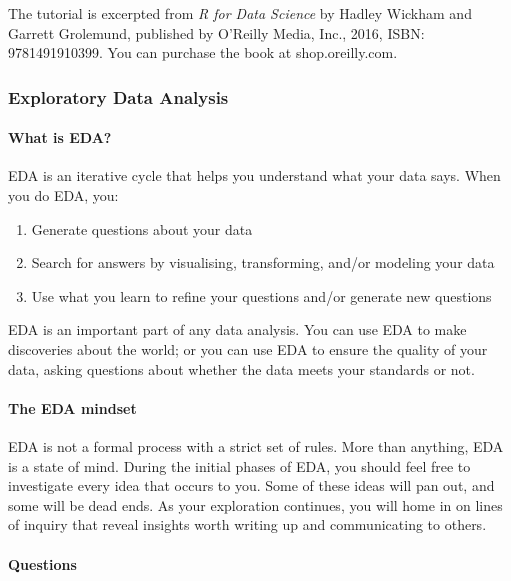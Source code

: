 \documentclass[
]{article}
\begin{document}
The tutorial is excerpted from \emph{R for Data Science} by Hadley
Wickham and Garrett Grolemund, published by O'Reilly Media, Inc., 2016,
ISBN: 9781491910399. You can purchase the book at shop.oreilly.com.

\hypertarget{exploratory-data-analysis-1}{%
\subsubsection{Exploratory Data
Analysis}\label{exploratory-data-analysis-1}}

\hypertarget{what-is-eda}{%
\paragraph{What is EDA?}\label{what-is-eda}}

EDA is an iterative cycle that helps you understand what your data says.
When you do EDA, you:

\begin{enumerate}
\def\labelenumi{\arabic{enumi}.}
\item
  Generate questions about your data
\item
  Search for answers by visualising, transforming, and/or modeling your
  data
\item
  Use what you learn to refine your questions and/or generate new
  questions
\end{enumerate}

EDA is an important part of any data analysis. You can use EDA to make
discoveries about the world; or you can use EDA to ensure the quality of
your data, asking questions about whether the data meets your standards
or not.

\hypertarget{the-eda-mindset}{%
\paragraph{The EDA mindset}\label{the-eda-mindset}}

EDA is not a formal process with a strict set of rules. More than
anything, EDA is a state of mind. During the initial phases of EDA, you
should feel free to investigate every idea that occurs to you. Some of
these ideas will pan out, and some will be dead ends. As your
exploration continues, you will home in on lines of inquiry that reveal
insights worth writing up and communicating to others.

\hypertarget{questions}{%
\paragraph{Questions}\label{questions}}
\end{document}
